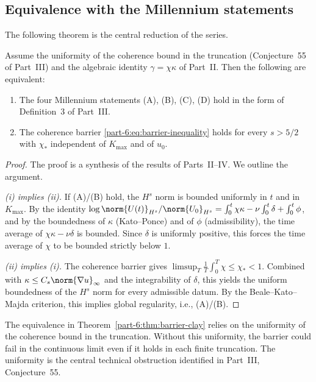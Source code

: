 \subsection{Equivalence with the Millennium statements}
\label{part-6:ssec:equivalence-barrier}

The following theorem is the central reduction of the series.

\begin{theorem}\label{part-6:thm:barrier-clay}
Assume the uniformity of the coherence bound in the truncation 
(Conjecture~55 of Part~III) and the algebraic identity 
$\gamma = \chi\kappa$ of Part~II. Then the following are equivalent:
\begin{enumerate}[label=(\roman*),leftmargin=*]
\item The four Millennium statements (A), (B), (C), (D) hold in 
      the form of Definition~3 of Part~III.
\item The coherence barrier \eqref{part-6:eq:barrier-inequality} holds 
      for every $s>5/2$ with $\chi_\ast$ independent of $K_{\max}$ 
      and of $u_0$.
\end{enumerate}
\end{theorem}

\begin{proof}
The proof is a synthesis of the results of Parts~II--IV. We outline 
the argument.

\emph{(i) implies (ii).} If (A)/(B) hold, the $H^s$ norm is bounded 
uniformly in $t$ and in $K_{\max}$. By the identity 
$\log\norm{U(t)}_{H^s}/\norm{U_0}_{H^s} = \int_0^t\chi\kappa - 
\nu\int_0^t\delta + \int_0^t\phi$, and by the boundedness of 
$\kappa$ (Kato--Ponce) and of $\phi$ (admissibility), the time 
average of $\chi\kappa - \nu\delta$ is bounded. Since $\delta$ is 
uniformly positive, this forces the time average of $\chi$ to be 
bounded strictly below $1$.

\emph{(ii) implies (i).} The coherence barrier gives 
$\limsup_T\frac{1}{T}\int_0^T\chi\leq\chi_\ast<1$. Combined with 
$\kappa\leq C_s\norm{\nabla u}_\infty$ and the integrability of 
$\delta$, this yields the uniform boundedness of the $H^s$ norm for 
every admissible datum. By the Beale--Kato--Majda criterion, this 
implies global regularity, i.e., (A)/(B).
\end{proof}

\begin{remark}\label{part-6:rem:uniformity-role}
The equivalence in Theorem~\ref{part-6:thm:barrier-clay} relies on the 
uniformity of the coherence bound in the truncation. Without this 
uniformity, the barrier could fail in the continuous limit even if 
it holds in each finite truncation. The uniformity is the central 
technical obstruction identified in Part~III, Conjecture~55.
\end{remark}


